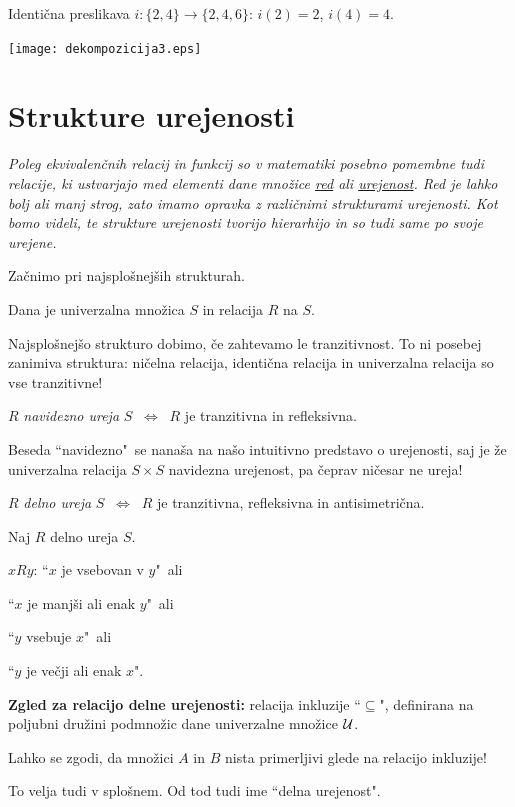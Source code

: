\documentclass[11pt,paper=b5,footinclude,headinclude]{scrbook} %
\def\cee {{~\Leftrightarrow~}}
\begin{document}
Identična preslikava $i:\{2,4\}\to\{2,4,6\}$: $i(2) = 2$, $i(4) = 4$.

\begin{center}
\texttt{[image: dekompozicija3.eps]}
\end{center}

\newpage
\section{Strukture urejenosti}

{\em Poleg ekvivalenčnih relacij in funkcij so v matematiki posebno pomembne tudi relacije, ki ustvarjajo med elementi dane množice \underline{red} ali \underline{urejenost}. Red je lahko bolj ali manj strog, zato imamo opravka z različnimi strukturami urejenosti. Kot bomo videli, te strukture urejenosti tvorijo hierarhijo in so tudi same po svoje urejene.}


\bigskip
Začnimo pri najsplošnejših strukturah.

\bigskip

Dana je univerzalna množica $S$ in relacija $R$ na $S$.

Najsplošnejšo strukturo dobimo, če zahtevamo le tranzitivnost.
To ni posebej zanimiva struktura: ničelna relacija, identična relacija in univerzalna relacija so vse tranzitivne!

\bigskip
$R$ {\em navidezno ureja} $S$ $\cee$ $R$ je tranzitivna in refleksivna.

Beseda ``navidezno"~se nanaša na našo intuitivno predstavo o urejenosti, saj je že univerzalna relacija $S\times S$ navidezna urejenost, pa čeprav ničesar ne ureja!

\medskip
$R$ {\em delno ureja} $S$ $\cee$ $R$ je tranzitivna, refleksivna in antisimetrična.

\medskip
Naj $R$ delno ureja $S$.

$xRy$: ``$x$ je vsebovan v $y$"~ali

``$x$ je manjši ali enak $y$"~ali

``$y$ vsebuje $x$"~ali

``$y$ je večji ali enak $x$".

\medskip
\textbf{ Zgled za relacijo delne urejenosti:} relacija inkluzije ``$\subseteq$", definirana na poljubni družini podmnožic dane univerzalne množice ${\cal U}$.

Lahko se zgodi, da množici  $A$ in $B$ nista primerljivi glede na relacijo inkluzije!

To velja tudi v splošnem. Od tod tudi ime ``delna urejenost".
\end{document}
